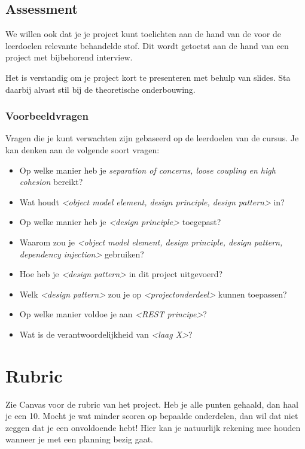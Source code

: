 \subsection{Assessment}
We willen ook dat je je project kunt toelichten 
aan de hand van de voor de leerdoelen relevante behandelde stof.
Dit wordt getoetst aan de hand van een project met bijbehorend interview.

Het is verstandig om je project kort te presenteren met behulp van slides.
Sta daarbij alvast stil bij de theoretische onderbouwing.

\subsubsection{Voorbeeldvragen}
Vragen die je kunt verwachten zijn gebaseerd op de leerdoelen van de cursus.
Je kan denken aan de volgende soort vragen:
\begin{itemize}
    \item Op welke manier heb je \textit{separation of concerns, loose coupling en high cohesion} bereikt?
    \item Wat houdt \textit{<object model element, design principle, design pattern>} in?
    \item Op welke manier heb je \textit{<design principle>} toegepast?
    \item Waarom zou je \textit{<object model element, design principle, design pattern, dependency injection>} gebruiken?
    \item Hoe heb je \textit{<design pattern>} in dit project uitgevoerd?
    \item Welk \textit{<design pattern>} zou je op \textit{<projectonderdeel>} kunnen toepassen?
    \item Op welke manier voldoe je aan \textit{<REST principe>}?
    \item Wat is de verantwoordelijkheid van \textit{<laag X>}?
\end{itemize}

\section{Rubric}
Zie Canvas voor de rubric van het project. Heb je alle punten gehaald, dan haal je een 10.
Mocht je wat minder scoren op bepaalde onderdelen, dan wil dat niet zeggen dat je een onvoldoende hebt!
Hier kan je natuurlijk rekening mee houden wanneer je met een planning bezig gaat.